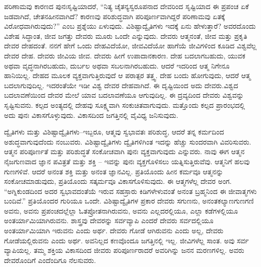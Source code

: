 ಪರಿಣಾಮವು ಕಾರಣದ ಪುನಃಸೃಷ್ಟಿಯಾದರೆ, “ನಿತ್ಯ ಚೈತನ್ಯಸ್ವರೂಪನಾದ ದೇವರಿಂದ ಸೃಷ್ಟಿಯಾದ ಈ ಪ್ರಪಂಚ ಏಕೆ ಜಡವಾಗಿದೆ, ಚೇತನಹೀನವಾಗಿದೆ? ಕಾರಣವು ಪರಿಶುದ್ಧವಾಗಿ ಪರಿಪೂರ್ಣವಾಗಿದ್ದರೆ ಪರಿಣಾಮವು ಏತಕ್ಕೆ ವಿರೋಧವಾಗಿರುವುದು?” ಎಂಬ ಪ್ರಶ್ನೆಯು ಏಳುವುದು. ವಿಶಿಷ್ಟಾದ್ವೈತಿಗಳು ಇದಕ್ಕೆ ಏನು ಹೇಳುತ್ತಾರೆ? ಅವರದೊಂದು ವಿಶೇಷ ಸಿದ್ಧಾಂತ, ಜೀವ ಜಗತ್ತು ದೇವರು ಮೂರು ಒಂದೇ ಎನ್ನುವುದು. ದೇವರು ಆತ್ಮನಂತೆ, ಜೀವ ಮತ್ತು ಪ್ರಕೃತಿ ದೇವರ ದೇಹದಂತೆ. ನನಗೆ ಹೇಗೆ ಒಂದು ದೇಹವಿದೆಯೋ, ಜೀವವಿದೆಯೋ ಹಾಗೆಯೆ ಜೀವಿಗಳಿಂದ ಕೂಡಿದ ವಿಶ್ವವೆಲ್ಲ ದೇವರ ದೇಹ. ದೇವರು ಜೀವಿಯ ಜೀವ. ದೇವರು ಹೀಗೆ ಉಪಾದಾನಕಾರಣ. ದೇಹ ಬದಲಾಗಬಹುದು, ಯುವಕ ಅಥವಾ ವೃದ್ಧನಾಗಿರಬಹುದು, ದುರ್ಬಲ ಅಥವಾ ಸಬಲನಾಗಿರಬಹುದು. ಆದರೆ ಇದರಿಂದ ಆತ್ಮ ನಿಗೇನೂ ಹಾನಿಯಿಲ್ಲ. ದೇಹದ ಮೂಲಕ ವ್ಯಕ್ತವಾಗುತ್ತಿರುವುದೆ ಆ ಪರಾತ್ಪರ ತತ್ತ್ವ. ದೇಹ ಬಂದು ಹೋಗುವುದು, ಆದರೆ ಆತ್ಮ ಬದಲಾಗುವುದಿಲ್ಲ. ಇದರಂತೆಯೇ ಇಡೀ ವಿಶ್ವ ದೇವರ ದೇಹವಾಗಿದೆ. ಈ ದೃಷ್ಟಿಯಿಂದ ಅದು ದೇವರು.ವಿಶ್ವದ ಬದಲಾವಣೆಯಿಂದ ದೇವರ ಮೇಲೆ ಯಾವ ಬದಲಾವಣೆಯೂ ಆಗುವುದಿಲ್ಲ. ಈ ದ್ರವ್ಯದಿಂದ ದೇವರು ವಿಶ್ವವನ್ನು ಸೃಷ್ಟಿಸುವನು. ಕಲ್ಪದ ಅಂತ್ಯದಲ್ಲಿ ದೇಹವು ಸೂಕ್ಷ್ಮವಾಗಿ ಸಂಕುಚಿತವಾಗುವುದು. ಮತ್ತೊಂದು ಕಲ್ಪದ ಪ್ರಾರಂಭದಲ್ಲಿ ಅದು ಪುನಃ ವಿಕಾಸಗೊಳ್ಳುವುದು. ವಿಕಾಸದಿಂದ ಜಗತ್ತಿನಲ್ಲಿ ವೈವಿಧ್ಯ ಜನಿಸುವುದು.

ದ್ವೈತಿಗಳು ಮತ್ತು ವಿಶಿಷ್ಟಾದ್ವೈತಿಗಳು–ಇಬ್ಬರೂ, ಆತ್ಮವು ಸ್ವಭಾವತಃ ಪರಿಶುದ್ಧ, ಆದರೆ ತನ್ನ ಕರ್ಮದಿಂದ ಅಶುದ್ಧವಾಗುವುದೆಂದು ನಂಬುವರು. ವಿಶಿಷ್ಟಾದ್ವೈತಿಗಳು ದ್ವೈತಿಗಳಿಗಿಂತ ಇದನ್ನು ಹೆಚ್ಚು ಸುಂದರವಾಗಿ ವಿವರಿಸುವರು. ಆತ್ಮನ ಪರಿಪೂರ್ಣತೆ ಮತ್ತು ಪರಿಶುದ್ಧತೆ ಸಂಕೋಚವಾಗಿ ಪುನಃ ವ್ಯಕ್ತವಾಗುವುದು ಎನ್ನುವರು. ನಾವು ಈಗ ಆತ್ಮನ ನೈಜಗುಣವಾದ ಜ್ಞಾನ ಪವಿತ್ರತೆ ಮತ್ತು ಶಕ್ತಿ – ಇವನ್ನು ಪುನಃ ವ್ಯಕ್ತಗೊಳಿಸಲು ಯತ್ನಿಸುತ್ತಿರುವೆವು. ಆತ್ಮನಿಗೆ ಹಲವು ಗುಣಗಳಿವೆ. ಆದರೆ ಅನಂತ ಶಕ್ತಿ ಮತ್ತು ಅನಂತ ಜ್ಞಾನವಿಲ್ಲ. ಪ್ರತಿಯೊಂದು ಹೀನ ಕರ್ಮವೂ ಆತ್ಮನನ್ನು ಸಂಕೋಚಮಾಡುವುದು, ಪ್ರತಿಯೊಂದು ಸತ್ಕರ್ಮವೂ ವಿಕಾಸಗೊಳಿಸುವುದು. ಈ ಆತ್ಮಗಳೆಲ್ಲ ದೇವರ ಅಂಗ. “ಅಗ್ನಿಕುಂಡದಿಂದ ಅದರ ಸ್ವಭಾವದಂತೆಯೆ ಇರುವ ಸಹಸ್ರಾರು ಕಿಡಿಗಳೇಳುವಂತೆ ಅನಂತ ಬ್ರಹ್ಮನಿಂದ ಈ ಜೀವಾತ್ಮಗಳು ಬಂದಿವೆ.” ಪ್ರತಿಯೊಂದರ ಗುರಿಯೂ ಒಂದೇ. ವಿಶಿಷ್ಟಾದ್ವೈತಿಗಳ ಪ್ರಕಾರ ದೇವರು ಸಗುಣನು, ಅನಂತಕಲ್ಯಾಣಗುಣಗಣಿ ಅವನು, ಅವನು ಪ್ರಪಂಚದಲ್ಲೆಲ್ಲಾ ಓತಪ್ರೋತನಾಗಿರುವನು, ಅವನು ಎಲ್ಲದರಲ್ಲಿಯೂ, ಎಲ್ಲಾ ಕಡೆಗಳಲ್ಲಿಯೂ ಅಂತರ್ಯಾಮಿಯಾಗಿರುವನು. ಶಾಸ್ತ್ರವು ದೇವರನ್ನು ಸರ್ವವ್ಯಾಪಿ ಎಂದರೆ ದೇವರು ಸರ್ವದಲ್ಲಿಯೂ ಅಂತರ್ಯಾಮಿಯಾಗಿ ಇರುವನು ಎಂದು ಅರ್ಥ. ದೇವರು ಗೋಡೆ ಆಗಿರುವನು ಎಂದು ಅಲ್ಲ, ದೇವರು ಗೋಡೆಯಲ್ಲಿರುವನು ಎಂದು ಅರ್ಥ. ಅವನಿಲ್ಲದ ಕಣವೊಂದೂ ಜಗತ್ತಿನಲ್ಲಿ ಇಲ್ಲ. ಜೀವಿಗಳೆಲ್ಲ ಸಾಂತ. ಅವು ಸರ್ವ ವ್ಯಾಪಿಯಲ್ಲ. ತಮ್ಮ ಶಕ್ತಿಯ ವಿಕಾಸದಿಂದ ಜೀವರು ಪರಿಪೂರ್ಣರಾದರೆ ಅವರಿಗಿನ್ನು ಜನನ ಮರಣಗಳಿಲ್ಲ. ಅವರು ದೇವರೊಂದಿಗೆ ಎಂದೆಂದಿಗೂ ನೆಲಸುವರು.

